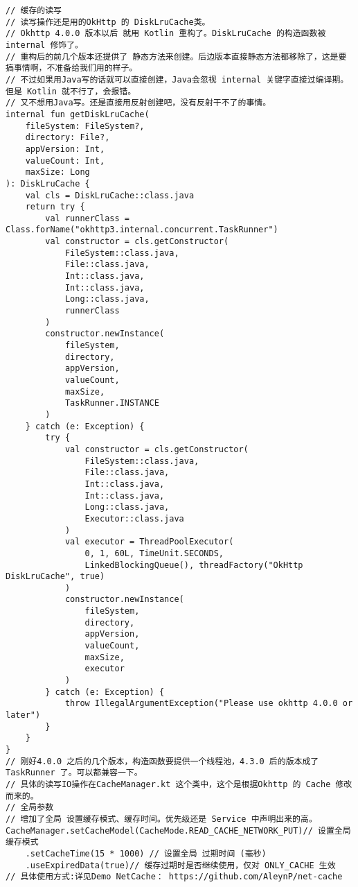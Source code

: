 \documentclass[9pt, b5paper]{article}
\begin{document}
\begin{verbatim}
// 缓存的读写
// 读写操作还是用的OkHttp 的 DiskLruCache类。
// Okhttp 4.0.0 版本以后 就用 Kotlin 重构了。DiskLruCache 的构造函数被 internal 修饰了。
// 重构后的前几个版本还提供了 静态方法来创建。后边版本直接静态方法都移除了，这是要搞事情啊，不准备给我们用的样子。
// 不过如果用Java写的话就可以直接创建，Java会忽视 internal 关键字直接过编译期。但是 Kotlin 就不行了，会报错。
// 又不想用Java写。还是直接用反射创建吧，没有反射干不了的事情。
internal fun getDiskLruCache(
    fileSystem: FileSystem?,
    directory: File?,
    appVersion: Int,
    valueCount: Int,
    maxSize: Long
): DiskLruCache {
    val cls = DiskLruCache::class.java
    return try {
        val runnerClass = Class.forName("okhttp3.internal.concurrent.TaskRunner")
        val constructor = cls.getConstructor(
            FileSystem::class.java,
            File::class.java,
            Int::class.java,
            Int::class.java,
            Long::class.java,
            runnerClass
        )
        constructor.newInstance(
            fileSystem,
            directory,
            appVersion,
            valueCount,
            maxSize,
            TaskRunner.INSTANCE
        )
    } catch (e: Exception) {
        try {
            val constructor = cls.getConstructor(
                FileSystem::class.java,
                File::class.java,
                Int::class.java,
                Int::class.java,
                Long::class.java,
                Executor::class.java
            )
            val executor = ThreadPoolExecutor(
                0, 1, 60L, TimeUnit.SECONDS,
                LinkedBlockingQueue(), threadFactory("OkHttp DiskLruCache", true)
            )
            constructor.newInstance(
                fileSystem,
                directory,
                appVersion,
                valueCount,
                maxSize,
                executor
            )
        } catch (e: Exception) {
            throw IllegalArgumentException("Please use okhttp 4.0.0 or later")
        }
    }
}
// 刚好4.0.0 之后的几个版本，构造函数要提供一个线程池，4.3.0 后的版本成了 TaskRunner 了。可以都兼容一下。
// 具体的读写IO操作在CacheManager.kt 这个类中，这个是根据Okhttp 的 Cache 修改而来的。
// 全局参数
// 增加了全局 设置缓存模式、缓存时间。优先级还是 Service 中声明出来的高。
CacheManager.setCacheModel(CacheMode.READ_CACHE_NETWORK_PUT)// 设置全局缓存模式
    .setCacheTime(15 * 1000) // 设置全局 过期时间 (毫秒)
    .useExpiredData(true)// 缓存过期时是否继续使用，仅对 ONLY_CACHE 生效
// 具体使用方式:详见Demo NetCache： https://github.com/AleynP/net-cache
\end{verbatim}
\end{document}
